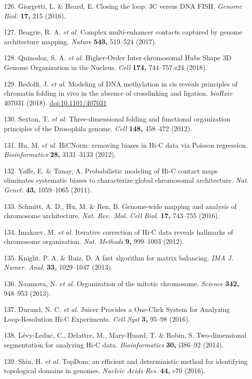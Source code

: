 \documentclass[11pt,twoside]{MPIthesis}
\theoremstyle{definition}
\theoremstyle{definition}
\theoremstyle{definition}
\theoremstyle{remark}
\begin{document}
126. Giorgetti, L. \& Heard, E. Closing the loop: 3C versus DNA FISH.
\emph{Genome Biol.} \textbf{17,} 215 (2016).

127. Beagrie, R. A. \emph{et al.} Complex multi-enhancer contacts
captured by genome architecture mapping. \emph{Nature} \textbf{543,}
519--524 (2017).

128. Quinodoz, S. A. \emph{et al.} Higher-Order Inter-chromosomal Hubs
Shape 3D Genome Organization in the Nucleus. \emph{Cell} \textbf{174,}
744--757.e24 (2018).

129. Redolfi, J. \emph{et al.} Modeling of DNA methylation in cis
reveals principles of chromatin folding in vivo in the absence of
crosslinking and ligation. \emph{bioRxiv} 407031 (2018).
\url{doi:10.1101/407031}

130. Sexton, T. \emph{et al.} Three-dimensional folding and functional
organization principles of the Drosophila genome. \emph{Cell}
\textbf{148,} 458--472 (2012).

131. Hu, M. \emph{et al.} HiCNorm: removing biases in Hi-C data via
Poisson regression. \emph{Bioinformatics} \textbf{28,} 3131--3133
(2012).

132. Yaffe, E. \& Tanay, A. Probabilistic modeling of Hi-C contact maps
eliminates systematic biases to characterize global chromosomal
architecture. \emph{Nat. Genet.} \textbf{43,} 1059--1065 (2011).

133. Schmitt, A. D., Hu, M. \& Ren, B. Genome-wide mapping and analysis
of chromosome architecture. \emph{Nat. Rev.~Mol. Cell Biol.}
\textbf{17,} 743--755 (2016).

134. Imakaev, M. \emph{et al.} Iterative correction of Hi-C data reveals
hallmarks of chromosome organization. \emph{Nat. Methods} \textbf{9,}
999--1003 (2012).

135. Knight, P. A. \& Ruiz, D. A fast algorithm for matrix balancing.
\emph{IMA J. Numer. Anal.} \textbf{33,} 1029--1047 (2013).

136. Naumova, N. \emph{et al.} Organization of the mitotic chromosome.
\emph{Science} \textbf{342,} 948--953 (2013).

137. Durand, N. C. \emph{et al.} Juicer Provides a One-Click System for
Analyzing Loop-Resolution Hi-C Experiments. \emph{Cell Syst} \textbf{3,}
95--98 (2016).

138. Lévy-Leduc, C., Delattre, M., Mary-Huard, T. \& Robin, S.
Two-dimensional segmentation for analyzing Hi-C data.
\emph{Bioinformatics} \textbf{30,} i386--92 (2014).

139. Shin, H. \emph{et al.} TopDom: an efficient and deterministic
method for identifying topological domains in genomes. \emph{Nucleic
Acids Res.} \textbf{44,} e70 (2016).
\end{document}
